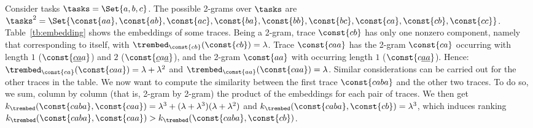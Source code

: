 \begin{example}\label{ex:wheredotiszero} %
	Consider tasks $\tasks=\Set{a,b,c}$. The possible 2-grams over $\tasks$ are $\tasks^2=\Set{\const{aa},\const{ab},\const{ac},\const{ba},\const{bb},\const{bc},\const{ca},\const{cb},\const{cc}}$. Table~\ref{tb:embedding} shows the embeddings of some traces. Being a 2-gram, trace $\const{cb}$ has only one nonzero component, namely that corresponding to itself, with $\trembed_{\const{cb}}(\const{cb})=\lambda$. Trace $\const{caa}$ has the 2-gram $\const{ca}$ occurring with length $1$ ($\const{\underline{ca}a}$) and $2$ ($\const{\underline{c}a\underline{a}}$), and the 2-gram $\const{aa}$ with occurring length $1$ ($\const{c\underline{aa}}$). Hence: $\trembed_{\const{ca}}(\const{caa})=\lambda+\lambda^2$ and  $\trembed_{\const{aa}}(\const{caa})=\lambda$.  Similar considerations can be carried out for the other traces in the table.
	We now want to compute the similarity between the first trace $\const{caba}$ and the other two traces. To do so, we sum, column by column (that is, 2-gram by 2-gram) the product of the embeddings for each pair of traces. We then get $k_{\trembed}(\const{caba},\const{caa})=\lambda^3+(\lambda+\lambda^3)(\lambda+\lambda^2)$ and $k_{\trembed}(\const{caba},\const{cb})=\lambda^3
	$,
	which induces ranking $
	k_{\trembed}(\const{caba},\const{caa})>
	k_{\trembed}(\const{caba},\const{cb})
	$.
\end{example}

\endinput




